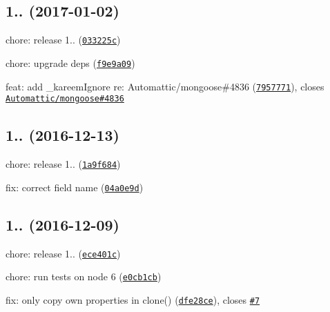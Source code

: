 \label{_1.2.0}%
 \subsection*{1.. (2017-\/01-\/02)}


\begin{DoxyItemize}
\item chore\+: release 1.. (\href{https://github.com/vkarpov15/kareem/commit/033225c}{\tt 033225c})
\item chore\+: upgrade deps (\href{https://github.com/vkarpov15/kareem/commit/f9e9a09}{\tt f9e9a09})
\item feat\+: add \+\_\+kareem\+Ignore re\+: Automattic/mongoose\#4836 (\href{https://github.com/vkarpov15/kareem/commit/7957771}{\tt 7957771}), closes \href{https://github.com/Automattic/mongoose/issues/4836}{\tt Automattic/mongoose\#4836}
\end{DoxyItemize}

\label{_1.1.5}%
 \subsection*{
\footnotesize 1.. (2016-\/12-\/13)
\normalsize }


\begin{DoxyItemize}
\item chore\+: release 1.. (\href{https://github.com/vkarpov15/kareem/commit/1a9f684}{\tt 1a9f684})
\item fix\+: correct field name (\href{https://github.com/vkarpov15/kareem/commit/04a0e9d}{\tt 04a0e9d})
\end{DoxyItemize}

\label{_1.1.4}%
 \subsection*{
\footnotesize 1.. (2016-\/12-\/09)
\normalsize }


\begin{DoxyItemize}
\item chore\+: release 1.. (\href{https://github.com/vkarpov15/kareem/commit/ece401c}{\tt ece401c})
\item chore\+: run tests on node 6 (\href{https://github.com/vkarpov15/kareem/commit/e0cb1cb}{\tt e0cb1cb})
\item fix\+: only copy own properties in clone() (\href{https://github.com/vkarpov15/kareem/commit/dfe28ce}{\tt dfe28ce}), closes \href{https://github.com/vkarpov15/kareem/issues/7}{\tt \#7}
\end{DoxyItemize}

